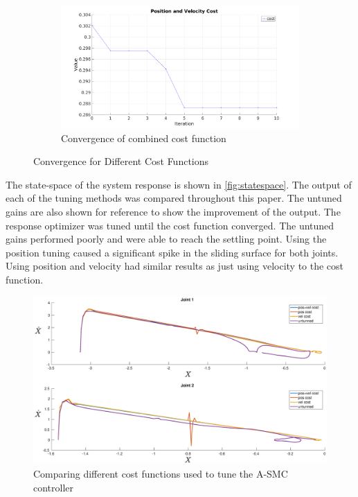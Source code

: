 \begin{figure}[ht]
    \begin{subfigure}{\textwidth}
        \centering
        \includegraphics[width=0.45\linewidth]{images/controllers/all_cost.png}
        \caption[Combined cost function]{Convergence of combined cost function}
        \label{fig:all_cost}
    \end{subfigure}
    \caption[Convergence for Different Cost Functions]{Convergence for Different Cost Functions}
    \label{fig:cost_function_optimization}
\end{figure}


The state-space of the system response is shown in  \autoref{fig:statespace}. The output of each of the tuning methods was compared throughout this paper. The untuned gains are also shown for reference to show the improvement of the output. The response optimizer was tuned until the cost function converged. The untuned gains performed poorly and were able to reach the settling point. Using the position tuning caused a significant spike in the sliding surface for both joints. Using position and velocity had similar results as just using velocity to the cost function. 


\begin{figure}[ht!]
    \centering
    \includegraphics[width=\linewidth]{images/controllers/statespace.eps}
    \caption[A-SMC State Space]{Comparing different cost functions used to tune the A-SMC controller}
    \label{fig:statespace}
\end{figure}

